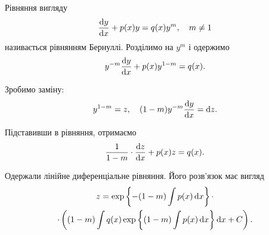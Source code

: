 Рівняння вигляду
\begin{equation*}
	\frac{\mathop{}\!\mathrm{d} y}{\mathop{}\!\mathrm{d} x} + p(x) y = q(x) y^m, \quad m \ne 1
\end{equation*}
називається рівнянням Бернуллі. Розділимо на $y^m$ і одержимо 
\begin{equation*}
	y^{-m} \frac{\mathop{}\!\mathrm{d} y}{\mathop{}\!\mathrm{d} x} + p(x) y^{1-m} = q(x).
\end{equation*}

Зробимо заміну: 
\begin{equation*}
	y^{1-m} = z, \quad (1 - m) y^{-m} \frac{\mathop{}\!\mathrm{d} y}{\mathop{}\!\mathrm{d} x} = \mathop{}\!\mathrm{d} z.
\end{equation*}

Підставивши в рівняння, отримаємо
\begin{equation*}
	\frac{1}{1-m} \cdot \frac{\mathop{}\!\mathrm{d} z}{\mathop{}\!\mathrm{d} x} + p(x) z = q(x).
\end{equation*}

Одержали лінійне диференціальне рівняння. Його розв’язок має вигляд
\begin{multline*}
	z = \exp\left\{ -(1 - m) \int p(x) \mathop{}\!\mathrm{d} x \right\} \cdot \\ 
	\cdot \left( (1-m) \int q(x) \exp\left\{ (1 - m) \int p(x) \mathop{}\!\mathrm{d} x \right\} \mathop{}\!\mathrm{d} x + C\right).
\end{multline*}
